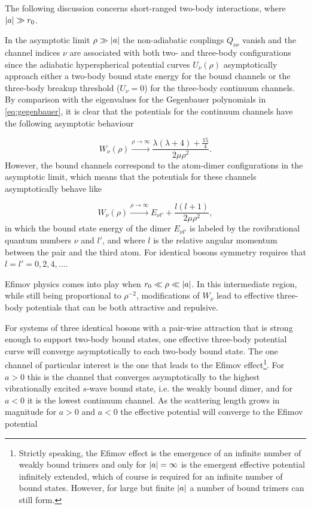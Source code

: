 The following discussion concerns short-ranged two-body interactions, where $\lvert a\rvert\gg r_0$. 

In the asymptotic limit $\rho \gg \lvert a\rvert$ the non-adiabatic couplings $Q_{\nu \nu}$ vanish and the channel indices $\nu$ are associated with both two- and three-body configurations since the adiabatic hyperspherical potential curves $U_{\nu}(\rho)$ asymptotically approach either a two-body bound state energy for the bound channels or the three-body breakup threshold ($U_{\nu}=0$) for the three-body continuum channels.  By comparison with the eigenvalues for the Gegenbauer polynomials in \eqref{eq:gegenbauer}, it is clear that the potentials for the continuum channels have the following asymptotic behaviour 

\begin{equation}\label{eq:continuumchannel}
W_{\nu}(\rho)  \xrightarrow{ \rho \to \infty} \frac{\lambda(\lambda+4)+\frac{15}{4}}{2\mu \rho^2}.
\end{equation}
However, the bound channels correspond to the atom-dimer configurations in the asymptotic limit, which means that the potentials for these channels asymptotically behave like

\begin{equation}\label{eq:weakdimer}
W_{\nu}(\rho)  \xrightarrow{ \rho \to \infty} E_{\nu l'} +\frac{l(l+1)}{2\mu \rho^2},
\end{equation} 
in which the bound state energy of the dimer $E_{\nu l'}$ is labeled by the rovibrational quantum numbers $\nu$ and $l'$, and where $l$ is the relative angular momentum between the pair and the third atom. For identical bosons symmetry requires that $l=l'=0,2,4,\ldots$.

Efimov physics comes into play when $r_0 \ll \rho \ll \lvert a\rvert$. In this intermediate region, while still being proportional to $\rho^{-2}$, modifications of $W_{\nu}$ lead to effective three-body potentials that can be both attractive and repulsive. 

For systems of three identical bosons with a pair-wise attraction that is strong enough to support two-body bound states, one effective three-body potential curve will converge asymptotically to each two-body bound state. The one channel of particular interest is the one that leads to the Efimov effect\footnote{Strictly speaking, the Efimov effect is the emergence of an infinite number of weakly bound trimers and only for $\lvert a\rvert = \infty$ is the emergent effective potential infinitely extended, which of course is required for an infinite number of bound states. However, for large but finite $\lvert a\rvert$ a number of bound trimers can still form.}. For $a>0$ this is the channel that converges asymptotically to the highest vibrationally excited $s$-wave bound state, i.e. the weakly bound dimer, and for $a<0$ it is the lowest continuum channel.  As the scattering length grows in magnitude for $a>0$ and $a<0$ the effective potential will converge to the Efimov potential 

